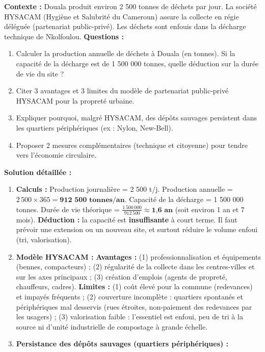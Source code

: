 \documentclass[11pt]{article}
\begin{document}
\begin{exoresolu}
\textbf{Contexte :} Douala produit environ 2 500 tonnes de déchets par jour. La société HYSACAM (Hygiène et Salubrité du Cameroun) assure la collecte en régie déléguée (partenariat public-privé). Les déchets sont enfouis dans la décharge technique de Nkolfoulou.
\textbf{Questions :}
\begin{enumerate}
    \item Calculer la production annuelle de déchets à Douala (en tonnes). Si la capacité de la décharge est de 1 500 000 tonnes, quelle déduction sur la durée de vie du site ?
    \item Citer 3 avantages et 3 limites du modèle de partenariat public-privé HYSACAM pour la propreté urbaine.
    \item Expliquer pourquoi, malgré HYSACAM, des dépôts sauvages persistent dans les quartiers périphériques (ex : Nylon, New-Bell).
    \item Proposer 2 mesures complémentaires (technique et citoyenne) pour tendre vers l'économie circulaire.
\end{enumerate}
\tcblower
\textbf{Solution détaillée :}
\begin{enumerate}
    \item \textbf{Calculs :}
    Production journalière = 2 500 t/j.
    Production annuelle = $2\,500 \times 365 = \textbf{912 500 tonnes/an}$.
    Capacité de la décharge = 1 500 000 tonnes.
    Durée de vie théorique = $\frac{1\,500\,000}{912\,500} \approx \textbf{1,6 an}$ (soit environ 1 an et 7 mois).
    \textbf{Déduction :} la capacité est \textbf{insuffisante} à court terme. Il faut prévoir une extension ou un nouveau site, et surtout réduire le volume enfoui (tri, valorisation).
    \item \textbf{Modèle HYSACAM :}
    \textbf{Avantages :} (1) professionnalisation et équipements (bennes, compacteurs) ; (2) régularité de la collecte dans les centres-villes et sur les axes principaux ; (3) création d'emplois (agents de propreté, chauffeurs, cadres).
    \textbf{Limites :} (1) coût élevé pour la commune (redevances) et impayés fréquents ; (2) couverture incomplète : quartiers spontanés et périphériques mal desservis (rues étroites, non-paiement des redevances par les usagers) ; (3) valorisation faible : l'essentiel est enfoui, peu de tri à la source ni d'unité industrielle de compostage à grande échelle.
    \item \textbf{Persistance des dépôts sauvages (quartiers périphériques) :}

\end{enumerate}
\end{exoresolu}
\end{document}
